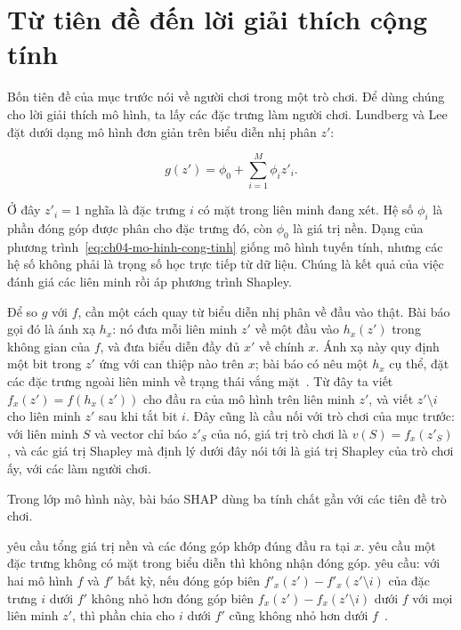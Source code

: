\section{Từ tiên đề đến lời giải thích cộng tính}
\label{sec:ch04-tu-tien-de-den-shap}

%
Bốn tiên đề của mục trước nói về người chơi trong một trò chơi. Để dùng chúng
cho lời giải thích mô hình, ta lấy các đặc trưng làm người chơi. Lundberg và
Lee đặt  dưới dạng mô hình
đơn giản trên biểu diễn nhị phân $z'$:

\begin{equation}
\label{eq:ch04-mo-hinh-cong-tinh}
g(z')=\phi_0+\sum_{i=1}^{M}\phi_i z'_i.
\end{equation}

Ở đây $z'_i=1$ nghĩa là đặc trưng $i$ có mặt trong liên minh đang xét. Hệ số
$\phi_i$ là phần đóng góp được phân cho đặc trưng đó, còn $\phi_0$ là giá trị
nền. Dạng của phương trình~\ref{eq:ch04-mo-hinh-cong-tinh} giống mô hình
tuyến tính, nhưng các hệ số không phải là trọng số học trực tiếp từ dữ liệu.
Chúng là kết quả của việc đánh giá các liên minh rồi áp phương trình Shapley.

Để so $g$ với $f$, cần một cách quay từ biểu diễn nhị phân về đầu vào thật.
Bài báo gọi đó là ánh xạ $h_x$: nó đưa mỗi liên minh $z'$ về một đầu vào
$h_x(z')$ trong không gian của $f$, và đưa biểu diễn đầy đủ $x'$ về chính $x$.
Ánh xạ này quy định một bit trong $z'$ ứng với can thiệp nào trên $x$; bài báo
có nêu một $h_x$ cụ thể, đặt các đặc trưng ngoài liên minh về trạng thái vắng
mặt~\autocite{p10shap}. Từ đây ta viết $f_x(z')=f(h_x(z'))$ cho đầu ra của mô
hình trên liên minh $z'$, và viết $z'\setminus i$ cho liên minh $z'$ sau khi
tắt bit $i$. Đây cũng là cầu nối với trò chơi của mục trước: với liên minh $S$
và vector chỉ báo $z'_S$ của nó, giá trị trò chơi là $v(S)=f_x(z'_S)$, và các
giá trị Shapley mà định lý dưới đây nói tới là giá trị Shapley của trò chơi
ấy, với các  làm người chơi.

Trong lớp mô hình này, bài báo SHAP dùng ba tính chất gần với các tiên đề trò
chơi.

\begin{definition}
\label{def:ch04-ba-tinh-chat}
 yêu cầu tổng giá trị nền và các đóng
góp khớp đúng đầu ra tại $x$.  yêu cầu một đặc
trưng không có mặt trong biểu diễn thì không nhận đóng góp.
 yêu cầu: với hai mô hình $f$ và $f'$ bất kỳ,
nếu đóng góp biên $f'_x(z')-f'_x(z'\setminus i)$ của đặc trưng $i$ dưới $f'$
không nhỏ hơn đóng góp biên $f_x(z')-f_x(z'\setminus i)$ dưới $f$ với mọi liên
minh $z'$, thì phần chia cho $i$ dưới $f'$ cũng không nhỏ hơn dưới
$f$~\autocite{p10shap}.
\end{definition}

